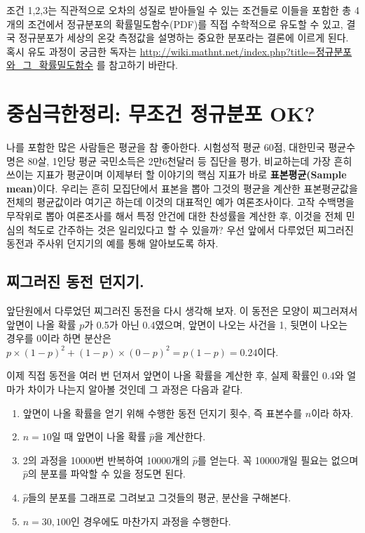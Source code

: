 \documentclass[]{book}
\providecommand{\tightlist}{%
  \setlength{\itemsep}{0pt}\setlength{\parskip}{0pt}}
\begin{document}
조건 1,2,3는 직관적으로 오차의 성질로 받아들일 수 있는 조건들로 이들을
포함한 총 4개의 조건에서 정규분포의 확률밀도함수(PDF)를 직접 수학적으로
유도할 수 있고, 결국 정규분포가 세상의 온갖 측정값을 설명하는 중요한
분포라는 결론에 이르게 된다. 혹시 유도 과정이 궁금한 독자는
\url{http://wiki.mathnt.net/index.php?title=정규분포와_그_확률밀도함수}
를 참고하기 바란다.

\section{중심극한정리: 무조건 정규분포
OK?}\label{uxc911uxc2ecuxadf9uxd55cuxc815uxb9ac-uxbb34uxc870uxac74-uxc815uxaddcuxbd84uxd3ec-ok}

나를 포함한 많은 사람들은 평균을 참 좋아한다. 시험성적 평균 60점,
대한민국 평균수명은 80살, 1인당 평균 국민소득은 2만6천달러 등 집단을
평가, 비교하는데 가장 흔히 쓰이는 지표가 평균이며 이제부터 할 이야기의
핵심 지표가 바로 \textbf{표본평균(Sample mean)}이다. 우리는 흔히
모집단에서 표본을 뽑아 그것의 평균을 계산한 표본평균값을 전체의
평균값이라 여기곤 하는데 이것의 대표적인 예가 여론조사이다. 고작
수백명을 무작위로 뽑아 여론조사를 해서 특정 안건에 대한 찬성률을 계산한
후, 이것을 전체 민심의 척도로 간주하는 것은 일리있다고 할 수 있을까?
우선 앞에서 다루었던 찌그러진 동전과 주사위 던지기의 예를 통해
알아보도록 하자.

\subsection{찌그러진 동전
던지기.}\label{uxcc0cuxadf8uxb7ecuxc9c4-uxb3d9uxc804-uxb358uxc9c0uxae30.}

앞단원에서 다루었던 찌그러진 동전을 다시 생각해 보자. 이 동전은 모양이
찌그러져서 앞면이 나올 확률 \(p\)가 0.5가 아닌 0.4였으며, 앞면이 나오는
사건을 1, 뒷면이 나오는 경우를 0이라 하면 분산은
\(p \times (1-p)^2 + (1-p) \times (0-p)^2 = p(1-p) = 0.24\)이다.

이제 직접 동전을 여러 번 던져서 앞면이 나올 확률을 계산한 후, 실제
확률인 0.4와 얼마가 차이가 나는지 알아볼 것인데 그 과정은 다음과 같다.

\begin{enumerate}
\def\labelenumi{\arabic{enumi}.}
\tightlist
\item
  앞면이 나올 확률을 얻기 위해 수행한 동전 던지기 횟수, 즉 표본수를
  \(n\)이라 하자.
\item
  \(n=10\)일 때 앞면이 나올 확률 \(\hat{p}\)을 계산한다.
\item
  2의 과정을 10000번 반복하여 10000개의 \(\hat{p}\)를 얻는다. 꼭
  10000개일 필요는 없으며 \(\hat{p}\)의 분포를 파악할 수 있을 정도면
  된다.
\item
  \(\hat{p}\)들의 분포를 그래프로 그려보고 그것들의 평균, 분산을
  구해본다.
\item
  \(n=30, 100\)인 경우에도 마찬가지 과정을 수행한다.
\end{enumerate}
\end{document}
